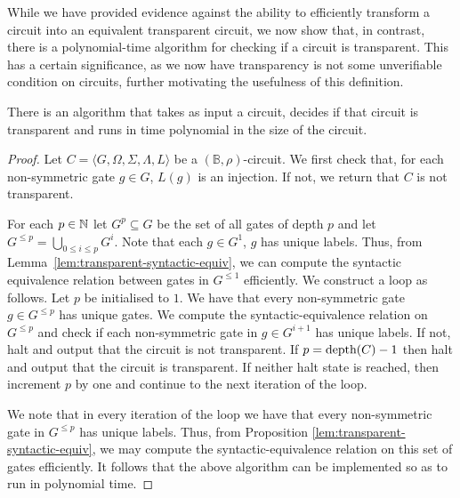 \documentclass[../paper.tex]{subfiles}
\begin{document}



While we have provided evidence against the ability to efficiently transform a
circuit into an equivalent transparent circuit, we now show that, in contrast,
there is a polynomial-time algorithm for checking if a circuit is transparent.
This has a certain significance, as we now have transparency is not some
unverifiable condition on circuits, further motivating the usefulness of this
definition.

\begin{prop}
  There is an algorithm that takes as input a circuit, decides if that circuit
  is transparent and runs in time polynomial in the size of the circuit.
  \label{prop:transparent-polynomial-time}
\end{prop}
\begin{proof}
  Let $C = \langle G, \Omega, \Sigma, \Lambda, L \rangle$ be a $(\mathbb{B},
  \rho)$-circuit. We first check that, for each non-symmetric gate $g \in G$,
  $L(g)$ is an injection. If not, we return that $C$ is not transparent.

  For each $p \in \mathbb{N}$ let $G^p \subseteq G$ be the set of all
  gates of depth $p$ and let $G^{\leq p} = \bigcup_{0 \leq i \leq p}G^i$. Note
  that each $g \in G^1$, $g$ has unique labels. Thus, from
  Lemma~\ref{lem:transparent-syntactic-equiv}, we can compute the syntactic
  equivalence relation between gates in $G^{\leq 1}$ efficiently. We construct a
  loop as follows. Let $p$ be initialised to $1$. We have that every
  non-symmetric gate $g \in G^{\leq p}$ has unique gates. We compute the
  syntactic-equivalence relation on $G^{\leq p}$ and check if each non-symmetric
  gate in $g \in G^{i + 1}$ has unique labels. If not, halt and output that the
  circuit is not transparent. If $p = \text{depth}(C) -1$ then halt and output that
  the circuit is transparent. If neither halt state is reached, then increment
  $p$ by one and continue to the next iteration of the loop.

  We note that in every iteration of the loop we have that every non-symmetric
  gate in $G^{\leq p}$ has unique labels. Thus, from Proposition
  \ref{lem:transparent-syntactic-equiv}, we may compute the
  syntactic-equivalence relation on this set of gates efficiently. It follows
  that the above algorithm can be implemented so as to run in polynomial time.
\end{proof}
\end{document}
